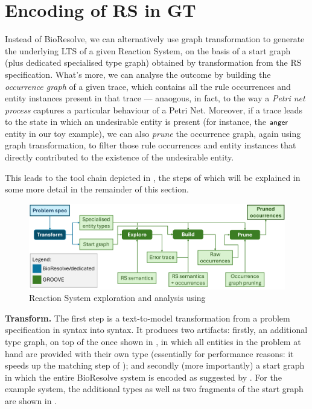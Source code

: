 
\section{Encoding of RS in GT}\label{sec:RS2GTS}

Instead of BioResolve, we can alternatively use graph transformation to generate the underlying LTS of a given Reaction System, on the basis of a start graph (plus dedicated specialised type graph) obtained by transformation from the RS specification. What's more, we can analyse the outcome by building the \emph{occurrence graph} of a given trace, which contains all the rule occurrences and entity instances present in that trace --- anaogous, in fact, to the way a \emph{Petri net process} captures a particular behaviour of a Petri Net. Moreover, if a trace leads to the state in which an undesirable entity is present (for instance, the $\mathsf{anger}$ entity in our toy example), we can also \emph{prune} the occurrence graph, again using graph transformation, to filter those rule occurrences and entity instances that directly contributed to the existence of the undesirable entity.

This leads to the tool chain depicted in , the steps of which will be explained in some more detail in the remainder of this section.

\begin{figure}
\centering
\includegraphics[scale=.25]{figs/chain}
\caption{Reaction System exploration and analysis using \GROOVE}
\label{fig:chain}
\end{figure}

\medskip\noindent\textbf{Transform.}
%
The first step is a text-to-model transformation from a problem specification in \BioResolve syntax into \GROOVE syntax. It produces two artifacts: firstly, an additional type graph, on top of the onee shown in , in which all entities in the problem at hand are provided with their own type (essentially for performance reasons: it speeds up the matching step of \GROOVE); and secondly (more importantly) a start graph in which the entire BioResolve system is encoded as suggested by . For the example system, the additional types as well as two fragments of the start graph are shown in .

